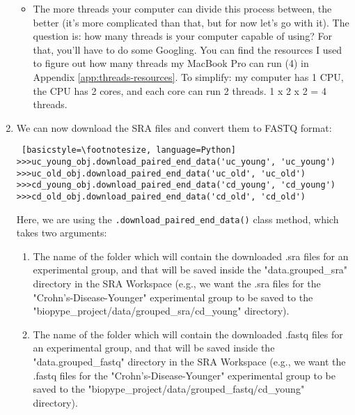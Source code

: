 \begin{enumerate}
            \begin{itemize}
	   \item The more threads your computer can divide this process between, the better (it's more complicated than that, but for now let's go with it). The question is: how many threads is your computer capable of using? For that, you'll have to do some Googling. You can find the resources I used to figure out how many threads my MacBook Pro can run (4) in Appendix \ref{app:threads-resources}. To simplify: my computer has 1 CPU, the CPU has 2 cores, and each core can run 2 threads. 1 x 2 x 2 = 4 threads.
	   \end{itemize}
%            
            
            \item {} We can now download the SRA files and convert them to FASTQ format:
            \begin{lstlisting} [basicstyle=\footnotesize, language=Python]
>>>uc_young_obj.download_paired_end_data('uc_young', 'uc_young')
>>>uc_old_obj.download_paired_end_data('uc_old', 'uc_old')
>>>cd_young_obj.download_paired_end_data('cd_young', 'cd_young')
>>>cd_old_obj.download_paired_end_data('cd_old', 'cd_old')
            \end{lstlisting}
             Here, we are using the \verb|.download_paired_end_data()| class method, which takes two arguments:
            \begin{enumerate}
            \item The name of the folder which will contain the downloaded .sra files for an experimental group, and that will be saved inside the "data.grouped\_sra" directory in the SRA Workspace (e.g., we want the .sra files for the "Crohn's-Disease-Younger" experimental group to be saved to the \newline "biopype\_project/data/grouped\_sra/cd\_young" directory).
            \item The name of the folder which will contain the downloaded .fastq files for an experimental group, and that will be saved inside the "data.grouped\_fastq" directory in the SRA Workspace (e.g., we want the .fastq files for the "Crohn's-Disease-Younger" experimental group to be saved to the \newline "biopype\_project/data/grouped\_fastq/cd\_young" directory).
            \end{enumerate}
            
        \end{enumerate}
        
